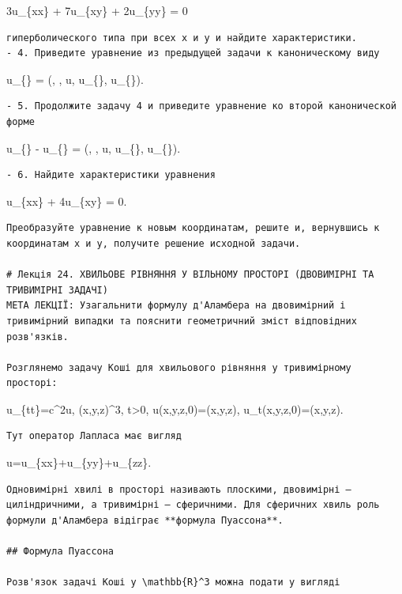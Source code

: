 \documentclass[
  ukrainian,
]{article}
\begin{document}
3u\_\{xx\} + 7u\_\{xy\} + 2u\_\{yy\} = 0

\begin{verbatim}
гиперболического типа при всех x и y и найдите характеристики.
- 4. Приведите уравнение из предыдущей задачи к каноническому виду
\end{verbatim}

u\_\{\xi\eta\} = \Phi(\xi, \eta, u, u\_\{\xi\}, u\_\{\eta\}).

\begin{verbatim}
- 5. Продолжите задачу 4 и приведите уравнение ко второй канонической форме
\end{verbatim}

u\_\{\alpha\alpha\} - u\_\{\beta\beta\} = \Psi(\alpha, \beta, u,
u\_\{\alpha\}, u\_\{\beta\}).

\begin{verbatim}
- 6. Найдите характеристики уравнения
\end{verbatim}

u\_\{xx\} + 4u\_\{xy\} = 0.

\begin{verbatim}
Преобразуйте уравнение к новым координатам, решите и, вернувшись к координатам x и y, получите решение исходной задачи.

# Лекція 24. ХВИЛЬОВЕ РІВНЯННЯ У ВІЛЬНОМУ ПРОСТОРІ (ДВОВИМІРНІ ТА ТРИВИМІРНІ ЗАДАЧІ)
МЕТА ЛЕКЦІЇ: Узагальнити формулу д'Аламбера на двовимірний і тривимірний випадки та пояснити геометричний зміст відповідних розв'язків.

Розглянемо задачу Коші для хвильового рівняння у тривимірному просторі:
\end{verbatim}

u\_\{tt\}=c\^{}2\Delta u, \qquad (x,y,z)\in{}\^{}3,
\qquad t\textgreater0, u(x,y,z,0)=\varphi(x,y,z),
\qquad u\_t(x,y,z,0)=\psi(x,y,z).

\begin{verbatim}
Тут оператор Лапласа має вигляд
\end{verbatim}

\Delta u=u\_\{xx\}+u\_\{yy\}+u\_\{zz\}.

\begin{verbatim}
Одновимірні хвилі в просторі називають плоскими, двовимірні — циліндричними, а тривимірні — сферичними. Для сферичних хвиль роль формули д'Аламбера відіграє **формула Пуассона**.

## Формула Пуассона

Розв'язок задачі Коші у \mathbb{R}^3 можна подати у вигляді
\end{verbatim}
\end{document}
